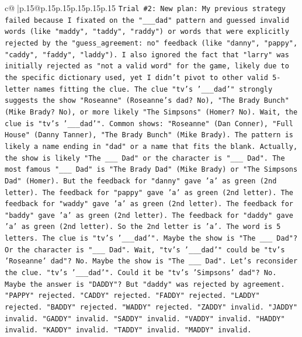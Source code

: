 \documentclass{article}
\begin{document}
{\begin{supertabular}{c@{$\;$}|p{.15\linewidth}@{}p{.15\linewidth}p{.15\linewidth}p{.15\linewidth}p{.15\linewidth}p{.15\linewidth}}
{{{\texttt{Trial \#2: New plan: My previous strategy failed because I fixated on the "\_\_\_dad" pattern and guessed invalid words (like "maddy", "taddy", "raddy") or words that were explicitly rejected by the "guess\_agreement: no" feedback (like "danny", "pappy", "caddy", "faddy", "laddy"). I also ignored the fact that "larry" was initially rejected as "not a valid word" for the game, likely due to the specific dictionary used, yet I didn't pivot to other valid 5{-}letter names fitting the clue. The clue "tv's '\_\_\_dad'" strongly suggests the show "Roseanne" (Roseanne's dad? No), "The Brady Bunch" (Mike Brady? No), or more likely "The Simpsons" (Homer? No). Wait, the clue is "tv's '\_\_\_dad'". Common shows: "Roseanne" (Dan Conner), "Full House" (Danny Tanner), "The Brady Bunch" (Mike Brady). The pattern is likely a name ending in "dad" or a name that fits the blank. Actually, the show is likely "The \_\_\_ Dad" or the character is "\_\_\_ Dad". The most famous "\_\_\_ Dad" is "The Brady Dad" (Mike Brady) or "The Simpsons Dad" (Homer). But the feedback for "danny" gave 'a' as green (2nd letter). The feedback for "pappy" gave 'a' as green (2nd letter). The feedback for "waddy" gave 'a' as green (2nd letter). The feedback for "baddy" gave 'a' as green (2nd letter). The feedback for "daddy" gave 'a' as green (2nd letter). So the 2nd letter is 'a'. The word is 5 letters. The clue is "tv's '\_\_\_dad'". Maybe the show is "The \_\_\_ Dad"? Or the character is "\_\_\_ Dad". Wait, "tv's '\_\_\_dad'" could be "tv's 'Roseanne' dad"? No. Maybe the show is "The \_\_\_ Dad". Let's reconsider the clue. "tv's '\_\_\_dad'". Could it be "tv's 'Simpsons' dad"? No. Maybe the answer is "DADDY"? But "daddy" was rejected by agreement. "PAPPY" rejected. "CADDY" rejected. "FADDY" rejected. "LADDY" rejected. "BADDY" rejected. "WADDY" rejected. "ZADDY" invalid. "JADDY" invalid. "GADDY" invalid. "SADDY" invalid. "VADDY" invalid. "HADDY" invalid. "KADDY" invalid. "TADDY" invalid. "MADDY" invalid.} \\
\\ 
}}}
\end{supertabular}}
\end{document}
